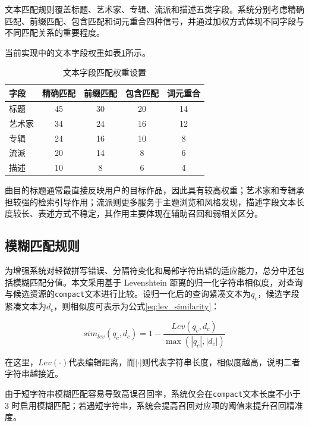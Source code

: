 文本匹配规则覆盖标题、艺术家、专辑、流派和描述五类字段。系统分别考虑精确匹配、前缀匹配、包含匹配和词元重合四种信号，并通过加权方式体现不同字段与不同匹配关系的重要程度。

当前实现中的文本字段权重如表\ref{tab:text_matching_weights}所示。

\begin{table}[htbp]
    \linespread{1.5}
    \songti
    \centering
    \caption{文本字段匹配权重设置}\label{tab:text_matching_weights}
    \begin{tabular}{|l|c|c|c|c|}
        \hline
        字段  & 精确匹配 & 前缀匹配 & 包含匹配 & 词元重合 \\ \hline
        标题  & 45   & 30   & 20   & 14   \\ \hline
        艺术家 & 34   & 24   & 16   & 12   \\ \hline
        专辑  & 24   & 16   & 10   & 8    \\ \hline
        流派  & 20   & 14   & 8    & 6    \\ \hline
        描述  & 10   & 8    & 6    & 4    \\ \hline
    \end{tabular}
\end{table}

曲目的标题通常最直接反映用户的目标作品，因此具有较高权重；艺术家和专辑承担较强的检索引导作用；流派则更多服务于主题浏览和风格发现，描述字段文本长度较长、表述方式不稳定，其作用主要体现在辅助召回和弱相关区分。

\subsection{模糊匹配规则}

为增强系统对轻微拼写错误、分隔符变化和局部字符出错的适应能力，总分中还包括模糊匹配分值。本文采用基于 Levenshtein 距离的归一化字符串相似度，对查询与候选资源的\texttt{compact}文本进行比较。设归一化后的查询紧凑文本为$q_c$，候选字段紧凑文本为$d_c$，则相似度可表示为公式\eqref{eq:lev_similarity}：

\begin{equation}
    sim_{lev}(q_c,d_c)=1-\frac{Lev(q_c,d_c)}{\max(|q_c|,|d_c|)}
    \label{eq:lev_similarity}
\end{equation}

在这里，$Lev(\cdot)$代表编辑距离，而$|\cdot|$则代表字符串长度，相似度越高，说明二者字符串越接近。

由于短字符串模糊匹配容易导致高误召回率，系统仅会在\texttt{compact}文本长度不小于 3 时启用模糊匹配；若遇短字符串，系统会提高召回对应项的阈值来提升召回精准度。

